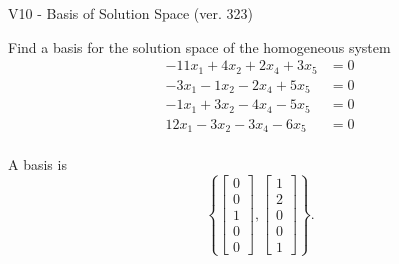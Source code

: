 \begin{exercise}
  \begin{exerciseTitle}V10 - Basis of Solution Space (ver. 323)\end{exerciseTitle}
  \begin{exerciseStatement}
    Find a basis for the solution space of the homogeneous system 
\begin{align*}
 -11 x_ 1 + 4 x_ 2 + 2 x_ 4 + 3 x_ 5 &= 0  \\ 
  -3 x_ 1 -1 x_ 2 -2 x_ 4 + 5 x_ 5 &= 0  \\ 
  -1 x_ 1 + 3 x_ 2 -4 x_ 4 -5 x_ 5 &= 0  \\ 
  12 x_ 1 -3 x_ 2 -3 x_ 4 -6 x_ 5 &= 0  \\ 
 \end{align*}


 
  \end{exerciseStatement}

  \begin{exerciseAnswer}
   A basis is   
\[\left\{\left[\begin{array}{c}
0 \\
0 \\
1 \\
0 \\
0
\end{array}\right] , \left[\begin{array}{c}
1 \\
2 \\
0 \\
0 \\
1
\end{array}\right]\right\}.\]

  


  \end{exerciseAnswer}
\end{exercise}